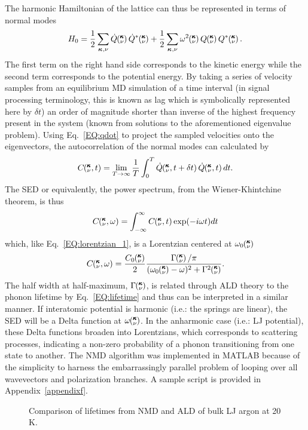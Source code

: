 %
The harmonic Hamiltonian of the lattice can thus be represented in terms of normal modes
%
\begin{equation}
H_0=\frac{1}{2}\sum_{\bm{\kappa},\nu}\dot{Q}\kv\dot{Q}^*\kv+\frac{1}{2}\sum_{\bm{\kappa},\nu}\omega^2\kv Q\kv Q^*\kv.
\end{equation}
%
The first term on the right hand side corresponds to the kinetic energy while the second term corresponds to the potential energy. By taking a series of velocity samples from an equilibrium MD simulation of a time interval (in signal processing terminology, this is known as lag which is symbolically represented here by $\delta t$) an order of magnitude shorter than inverse of the highest frequency present in the system (known from solutions to the aforementioned eigenvalue problem). Using Eq.~\ref{EQ:qdot} to project the sampled velocities onto the eigenvectors, the autocorrelation of the normal modes can calculated by
%
\begin{equation}\label{EQ:corrqdot}
C\kvt=\lim_{T \rightarrow \infty}\frac{1}{T}\int_{0}^{T}\dot{Q}\kvtt \dot{Q}\kvt dt.
\end{equation}
%
The SED or equivalently, the power spectrum, from the Wiener-Khintchine theorem, is thus
%
\begin{equation}\label{EQ:NMD:SED}
C\mspace{-4.0mu}\left(\mspace{-8.0mu} \begin{smallmatrix}&\pmb{\kappa} \\&\nu\end{smallmatrix} \mspace{-2.0mu},\omega\right)=\int_{-\infty}^{\infty}C\mspace{-4.0mu}\left(\mspace{-8.0mu} \begin{smallmatrix}&\pmb{\kappa} \\&\nu\end{smallmatrix} \mspace{-2.0mu},t\right) \exp(-i\omega t)dt
\end{equation}
%
which, like Eq.~\ref{EQ:lorentzian_1}, is a Lorentzian centered at $\omega_0\mspace{-4.0mu}\left(\mspace{-8.0mu} \begin{smallmatrix}&\pmb{\kappa} \\&\nu\end{smallmatrix} \mspace{-3.0mu}\right)$
%
\begin{equation}\label{EQ:NMD:LOR}
C\kvw=\frac{C_0\kv}{2}\frac{\Gamma\kv/\pi}{(\omega_0\kv-\omega)^2+\Gamma^2\kv}.
\end{equation}
%
The half width at half-maximum, $\Gamma\mspace{-4.0mu}\left(\mspace{-8.0mu} \begin{smallmatrix}&\pmb{\kappa} \\&\nu\end{smallmatrix} \mspace{-3.0mu}\right)$, is related through ALD theory \cite{PhysRev.128.2589} to the phonon lifetime by Eq.~\ref{EQ:lifetime} and thus can be interpreted in a similar manner. If interatomic potential is harmonic (i.e.: the springs are linear), the SED will be a Delta function at $\omega\mspace{-4.0mu}\left(\mspace{-8.0mu} \begin{smallmatrix}&\pmb{\kappa} \\&\nu\end{smallmatrix} \mspace{-3.0mu}\right)$. In the anharmonic case (i.e.: LJ potential), these Delta functions broaden into Lorentzians, which corresponds to scattering processes, indicating a non-zero probability of a phonon transitioning from one state to another.
The NMD algorithm was implemented in MATLAB because of the simplicity to harness the embarrassingly parallel problem of looping over all wavevectors and polarization branches. A sample script is provided in Appendix~\ref{appendixf}.

\begin{figure}[t!]
\begin{center}
\renewcommand{\figure}{Fig.}
\caption{Comparison of lifetimes from NMD and ALD of bulk LJ argon at 20 K.}
\label{FIG:NMD_v_ALD}
\end{center}
\end{figure}

